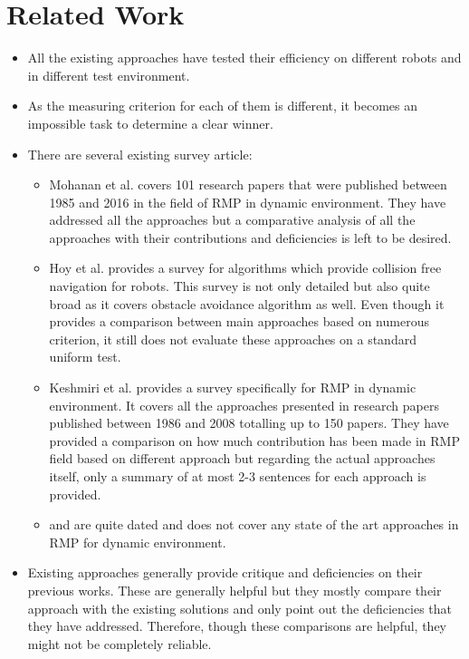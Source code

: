 \documentclass[rnd]{mas_proposal}
\begin{document}
\chapter{Related Work}
\begin{itemize}
    \item All the existing approaches have tested their efficiency on different robots and in different test environment.
    \item As the measuring criterion for each of them is different, it becomes an impossible task to determine a clear winner.
    \item There are several existing survey article:
        \begin{itemize}
            \item Mohanan et al. \cite{mohanan2018a} covers 101 research papers that were published between 1985 and 2016 in the field of RMP in dynamic environment. 
                They have addressed all the approaches but a comparative analysis of all the approaches with their contributions and deficiencies is left to be desired.
            \item Hoy et al. \cite{hoy2015algorithms} provides a survey for algorithms which provide collision free navigation for robots. 
                This survey is not only detailed but also quite broad as it covers obstacle avoidance algorithm as well. 
                Even though it provides a comparison between main approaches based on numerous criterion, it still does not evaluate these approaches on a standard uniform test.
            \item Keshmiri et al.\cite{keshmiri2009overview} provides a survey specifically for RMP in dynamic environment. 
                It covers all the approaches presented in research papers published between 1986 and 2008 totalling up to 150 papers. 
                They have provided a comparison on how much contribution has been made in RMP field based on different approach but regarding the actual approaches itself, only a summary of at most 2-3 sentences for each approach is provided.
            \item \cite{fujimura1991motion} and \cite{tsubouchi1996motion} are quite dated and does not cover any state of the art approaches in RMP for dynamic environment.
        \end{itemize}
    \item Existing approaches generally provide critique and deficiencies on their previous works. These are generally helpful but they mostly compare their approach with the existing solutions and only point out the deficiencies that they have addressed. Therefore, though these comparisons are helpful, they might not be completely reliable.
\end{itemize}
\end{document}
